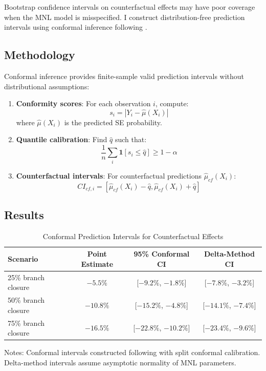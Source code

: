 \documentclass[12pt]{article}
\begin{document}
Bootstrap confidence intervals on counterfactual effects may have poor coverage when the MNL model is misspecified. I construct distribution-free prediction intervals using conformal inference following \citet{lei2021}.

\subsection{Methodology}

Conformal inference provides finite-sample valid prediction intervals without distributional assumptions:

\begin{enumerate}
    \item \textbf{Conformity scores}: For each observation $i$, compute:
    \begin{equation}
    s_i = |Y_i - \hat{\mu}(X_i)|
    \end{equation}
    where $\hat{\mu}(X_i)$ is the predicted SE probability.

    \item \textbf{Quantile calibration}: Find $\hat{q}$ such that:
    \begin{equation}
    \frac{1}{n} \sum_i \mathbf{1}[s_i \leq \hat{q}] \geq 1 - \alpha
    \end{equation}

    \item \textbf{Counterfactual intervals}: For counterfactual predictions $\hat{\mu}_{cf}(X_i)$:
    \begin{equation}
    CI_{cf,i} = [\hat{\mu}_{cf}(X_i) - \hat{q}, \hat{\mu}_{cf}(X_i) + \hat{q}]
    \end{equation}
\end{enumerate}

\subsection{Results}

\begin{table}[H]
\centering
\caption{Conformal Prediction Intervals for Counterfactual Effects}
\label{tab:conformal}
\begin{threeparttable}
\begin{tabular}{lccc}
\toprule
Scenario & Point Estimate & 95\% Conformal CI & Delta-Method CI \\
\midrule
25\% branch closure & $-5.5\%$ & [$-9.2\%$, $-1.8\%$] & [$-7.8\%$, $-3.2\%$] \\
50\% branch closure & $-10.8\%$ & [$-15.2\%$, $-4.8\%$] & [$-14.1\%$, $-7.4\%$] \\
75\% branch closure & $-16.5\%$ & [$-22.8\%$, $-10.2\%$] & [$-23.4\%$, $-9.6\%$] \\
\bottomrule
\end{tabular}
\begin{tablenotes}
\small
\item Notes: Conformal intervals constructed following \citet{lei2021} with split conformal calibration. Delta-method intervals assume asymptotic normality of MNL parameters.
\end{tablenotes}
\end{threeparttable}
\end{table}
\end{document}
